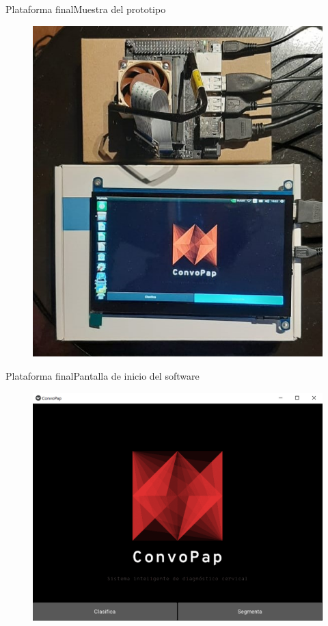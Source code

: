 \documentclass{beamer}
\begin{document}
    \begin{frame}{Plataforma final}{Muestra del prototipo}
        \begin{figure}[]
            \centering
            \includegraphics[height=0.95\textheight]{prototipo_final}
        \end{figure}
    \end{frame}

    \begin{frame}{Plataforma final}{Pantalla de inicio del software}
        \begin{figure}[]
            \centering
            \includegraphics[height=0.95\textheight]{gui}
        \end{figure}
    \end{frame}
\end{document}
